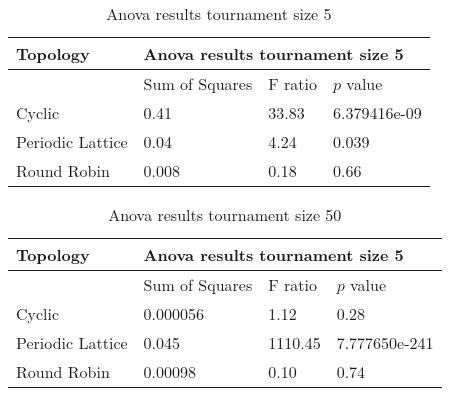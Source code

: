 \begin{table}[H]
\centering
\begin{adjustbox}{width=0.5\textwidth}
\small
\begin{tabular}{|l|l|l|l|}
\hline
Topology         & \multicolumn{3}{l|}{Anova results tournament size 5} \\ \hline
                 & Sum of Squares      & F ratio     & \(p\) value          \\ \hline
Cyclic           & 0.41                & 33.83       & 6.379416e-09     \\ \hline
Periodic Lattice & 0.04                & 4.24        & 0.039            \\ \hline
Round Robin      & 0.008               & 0.18        & 0.66             \\ \hline
\end{tabular}
\end{adjustbox}
\caption{Anova results tournament size 5}
\label{anova-size-five}
\end{table}

\begin{table}[H]
\centering
\begin{adjustbox}{width=0.5\textwidth}
\small
\begin{tabular}{|l|l|l|l|}
\hline
Topology         & \multicolumn{3}{l|}{Anova results tournament size 5} \\ \hline
                 & Sum of Squares     & F ratio     & \(p\) value           \\ \hline
Cyclic           & 0.000056           & 1.12        & 0.28              \\ \hline
Periodic Lattice & 0.045              & 1110.45     & 7.777650e-241     \\ \hline
Round Robin      & 0.00098            & 0.10        & 0.74              \\ \hline
\end{tabular}
\end{adjustbox}
\caption{Anova results tournament size 50}
\label{anova-size-fifty}
\end{table}


